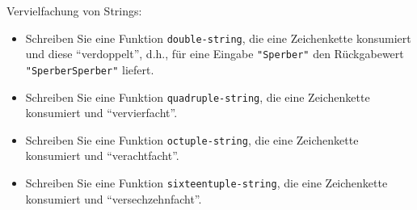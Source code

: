 \begin{aufgabe}
 Vervielfachung von Strings:
 \begin{itemize}
  \item Schreiben Sie eine Funktion \texttt{double-string}, die eine Zeichenkette konsumiert und
    diese "`verdoppelt"', d.h., für eine Eingabe \verb|"Sperber"| den
    Rückgabewert \verb|"SperberSperber"| liefert.
    
  \item Schreiben Sie eine Funktion \texttt{quadruple-string}, die eine
    Zeichenkette konsumiert und "`vervierfacht"'.

  \item Schreiben Sie eine Funktion \texttt{octuple-string}, die eine
    Zeichenkette konsumiert und "`verachtfacht"'.

  \item Schreiben Sie eine Funktion \texttt{sixteentuple-string}, die
    eine Zeichenkette konsumiert und "`versechzehnfacht"'.
  \end{itemize}


\end{aufgabe}

